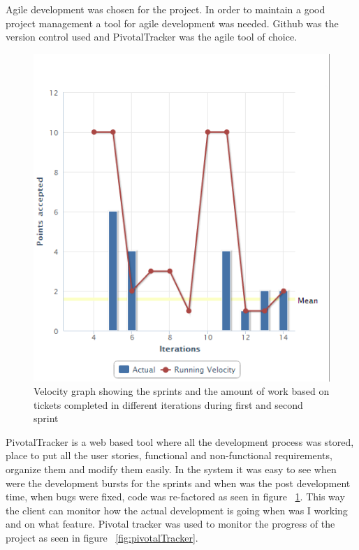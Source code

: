 Agile development was chosen for the project. In order to maintain a good project management a tool for
agile development was needed. Github \cite{github} was the version control used and PivotalTracker \cite{pivotal}
was the agile tool of choice.

\begin{figure}[htp]
\centering
\includegraphics[scale=0.8]{Figures/pivotalGraph.png}
\caption{Velocity graph showing the sprints and the amount of work based on tickets completed in different iterations during first and second sprint}
\label{fig:pivotalGraph}
\end{figure}

PivotalTracker is a web based tool where all the development process was stored, place to put all the user stories, functional
and non-functional requirements, organize them and modify them easily. In the system it was easy to see when were the development bursts for the sprints and when was the post development time, when bugs were fixed, code was re-factored as seen in figure ~\ref{fig:pivotalGraph}.
This way the client can monitor how the actual development is going when was I working and on what feature. Pivotal tracker was used to monitor the progress
of the project as seen in figure ~\ref{fig:pivotalTracker}.

